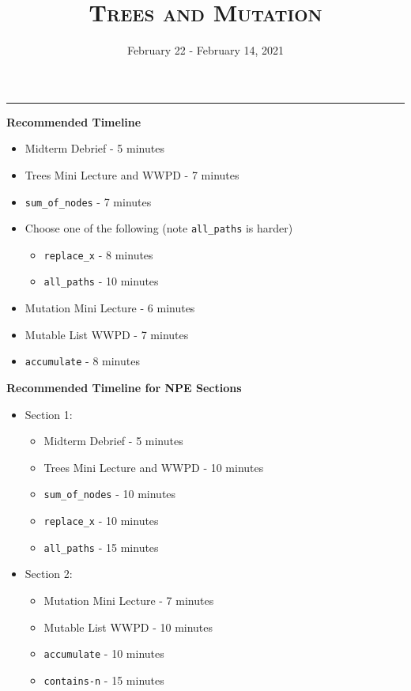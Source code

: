 \documentclass{exam}
\title{\textsc{Trees and Mutation}}
\date{February 22 - February 14, 2021}
\begin{document}
\maketitle
\rule{\textwidth}{0.15em}
\fontsize{12}{15}\selectfont


\begin{guide}
    \textbf{Recommended Timeline}
    \begin{itemize}
        \item Midterm Debrief - 5 minutes
        \item Trees Mini Lecture and WWPD - 7 minutes
        \item \lstinline{sum_of_nodes} - 7 minutes
        \item Choose one of the following (note \lstinline{all_paths} is harder)
            \begin{itemize}
            \item \lstinline{replace_x} - 8 minutes
            \item \lstinline{all_paths} - 10 minutes
            \end{itemize}
        \item Mutation Mini Lecture - 6 minutes
        \item Mutable List WWPD - 7 minutes
        \item \lstinline{accumulate} - 8 minutes
    \end{itemize}
    \vspace{.5cm}
    \textbf{Recommended Timeline for NPE Sections}
    \begin{itemize}
        \item Section 1:
            \begin{itemize}
            \item Midterm Debrief - 5 minutes
            \item Trees Mini Lecture and WWPD - 10 minutes
            \item \lstinline{sum_of_nodes} - 10 minutes
            \item \lstinline{replace_x} - 10 minutes
            \item \lstinline{all_paths} - 15 minutes
            \end{itemize} 
        \item Section 2:
            \begin{itemize}
            \item Mutation Mini Lecture - 7 minutes
            \item Mutable List WWPD - 10 minutes
            \item \lstinline{accumulate} - 10 minutes
            \item \lstinline{contains-n} - 15 minutes
            \end{itemize}
    \end{itemize}
\end{guide}
\end{document}

